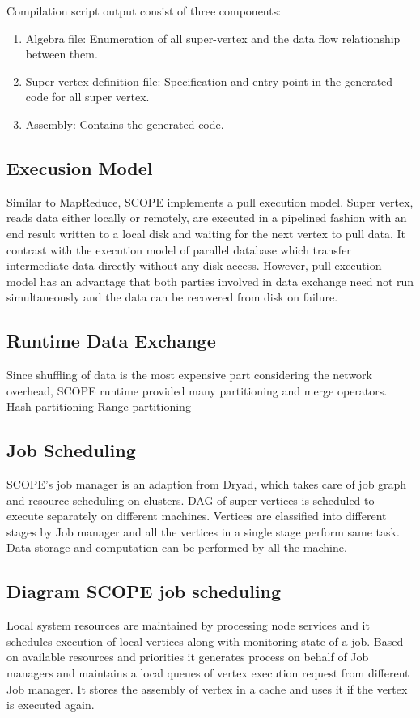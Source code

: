 \documentclass[runningheads,a4paper]{llncs}
\begin{document}
Compilation script output consist of three components:
\begin{enumerate}
	\item Algebra file: Enumeration of all super-vertex and the data flow relationship between them.
	\item Super vertex definition file: Specification and entry point in the generated code for all super vertex.
	\item Assembly: Contains the generated code.
\end{enumerate}

\subsection*{Execusion Model}
Similar to MapReduce, SCOPE implements a pull execution model. Super vertex, reads data either locally or remotely, are executed in a pipelined fashion with an end result written to a local disk and waiting for the next vertex to pull data. It contrast with the execution model of parallel database which transfer intermediate data directly without any disk access. However, pull execution model has an advantage that both parties involved in data exchange need not run simultaneously and the data can be recovered from disk on failure.

\subsection*{Runtime Data Exchange}
Since shuffling of data is the most expensive part considering the network overhead, SCOPE runtime provided many partitioning and merge operators.
Hash partitioning
Range partitioning

\subsection*{Job Scheduling}
SCOPE's job manager is an adaption from Dryad, which takes care of job graph and resource scheduling on clusters. DAG of super vertices is scheduled to execute separately on different machines. Vertices are classified into different stages by Job manager and all the vertices in a single stage perform same task.  Data storage and computation can be performed by all the machine.\\
\subsection*{Diagram SCOPE job scheduling}
Local system resources are maintained by processing node services and it schedules execution of local vertices along with monitoring state of a job. Based on available resources and priorities it generates process on behalf of Job managers and maintains a local queues of vertex execution request from different Job manager. It stores the assembly of vertex in a cache and uses it if the vertex is executed again.\\
\end{document}

